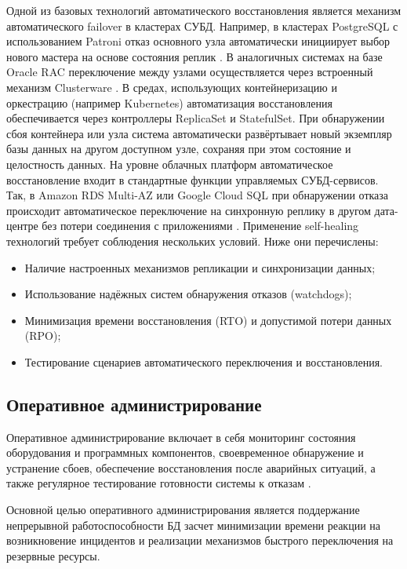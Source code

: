 Одной из базовых технологий автоматического восстановления является механизм автоматического failover в кластерах СУБД. Например, в кластерах PostgreSQL с использованием Patroni отказ основного узла автоматически инициирует выбор нового мастера на основе состояния реплик \autocite{Kleppmann}. В аналогичных системах на базе Oracle RAC переключение между узлами осуществляется через встроенный механизм Clusterware \autocite{OracleRAC}.
В средах, использующих контейнеризацию и оркестрацию (например Kubernetes) автоматизация восстановления обеспечивается через контроллеры ReplicaSet и StatefulSet. При обнаружении сбоя контейнера или узла система автоматически развёртывает новый экземпляр базы данных на другом доступном узле, сохраняя при этом состояние и целостность данных.
На уровне облачных платформ автоматическое восстановление входит в стандартные функции управляемых СУБД-сервисов. Так, в Amazon RDS Multi-AZ или Google Cloud SQL при обнаружении отказа происходит автоматическое переключение на синхронную реплику в другом дата-центре без потери соединения с приложениями \autocite{AmazonRds2}.
Применение self-healing технологий требует соблюдения нескольких условий. Ниже они перечислены:
\begin{itemize}
    \item Наличие настроенных механизмов репликации и синхронизации данных;
    \item Использование надёжных систем обнаружения отказов (watchdogs);
    \item Минимизация времени восстановления (RTO) и допустимой потери данных (RPO);
    \item Тестирование сценариев автоматического переключения и восстановления.
\end{itemize}


\subsection{Оперативное администрирование}

Оперативное администрирование включает в себя мониторинг состояния оборудования и программных компонентов, своевременное обнаружение и устранение сбоев, обеспечение восстановления после аварийных ситуаций, а также регулярное тестирование готовности системы к отказам \autocites{SameerParadkar}{heycoachHAA}.

Основной целью оперативного администрирования является поддержание непрерывной работоспособности БД засчет минимизации времени реакции на возникновение инцидентов и реализации механизмов быстрого переключения на резервные ресурсы.

